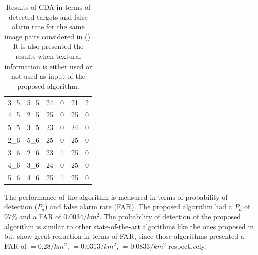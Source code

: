 \begin{table}[h]
\begin{tabular}{|c|c||c|c|c|c|}
       3\_5&5\_5&24&0&21&2\\
       4\_5&2\_5&25&0&25&0\\
       5\_5&3\_5&23&0&24&0\\
       \hline
       2\_6&5\_6&25&0&25&0\\
       3\_6&2\_6&23&1&25&0\\
       4\_6&3\_6&24&0&25&0\\
       5\_6&4\_6&25&1&25&0\\
       \hline
  \end{tabular}
  \caption{Results of CDA in terms of detected targets and false alarm rate  for the same image pairs considered in (\cite{Carabas}). It is also presented  the results when textural information is either used or not used as input of the proposed algorithm.}
  \label{tab:carabas_results_table}
\end{table}

The performance of the algorithm is measured in terms of probability of detection ($P_d$) and false alarm rate (FAR). The proposed algorithm had a $P_d$ of 97\% and a FAR of $0.0034{/}km^2$. The probability of detection of the proposed algorithm is similar to other state-of-the-art algorithms like the ones proposed in \cite{Ricardo, Campos, Vinholi} but show great reduction in terms of FAR, since those algorithms presented a FAR of $=0.28{/} km^2$, $=0.0313{/} km^2$, $= 0.0833{/} km^2$ respectively.